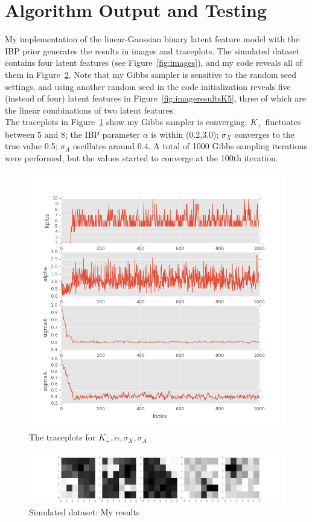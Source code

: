 \section{Algorithm Output and Testing}
My implementation of the linear-Gaussian binary latent feature model with the IBP prior generates the results in images and traceplots. The simulated dataset contains four latent features (see Figure~\ref{fig:images}), and my code reveals all of them in Figure~\ref{fig:imageresults}. Note that my Gibbs sampler is sensitive to the random seed settings, and using another random seed in the code initialization reveals five (instead of four) latent features in Figure~\ref{fig:imageresultsK5}, three of which are the linear combinations of two latent features.\\ 

The traceplots in Figure~\ref{fig:plotresults} show my Gibbs sampler is converging: $K_+$ fluctuates between 5 and 8; the IBP parameter $\alpha$ is within (0.2,3.0); $\sigma_X$ converges to the true value 0.5; $\sigma_A$ oscillates around 0.4. A total of 1000 Gibbs sampling iterations were performed, but the values started to converge at the 100th iteration.

\begin{figure}[!ht]
\centering
    \includegraphics[width=0.65\linewidth]{IBP_plot_results.png}
    \vspace{-20pt}
    \caption{The traceplots for $K_+, \alpha, \sigma_X, \sigma_A$}
    \label{fig:plotresults}
\end{figure}

\begin{figure}[!ht]
\centering
    \includegraphics[width=\linewidth]{IBP_image_results.png}
    \caption{Simulated dataset: My results}
    \label{fig:imageresults}
\end{figure}

